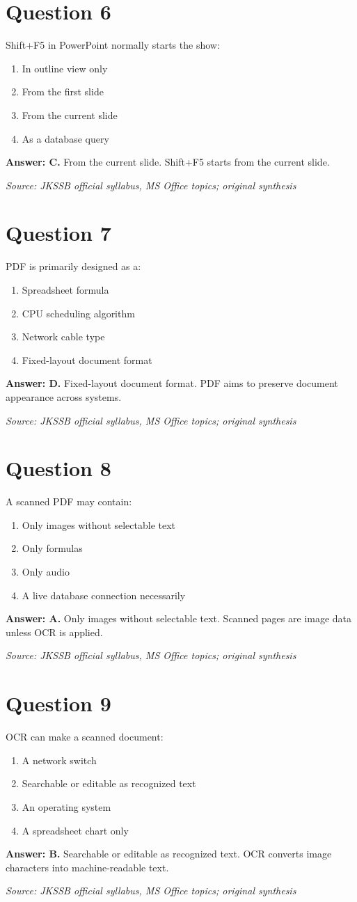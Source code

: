 \documentclass[11pt,a4paper]{book}
\newcommand{\source}[1]{\par\smallskip\textit{Source: #1}}
\newcommand{\answer}[2]{\par\textbf{Answer: #1.} #2}
\begin{document}
\section*{Question 6}
Shift+F5 in PowerPoint normally starts the show:
\begin{enumerate}[label=\Alph*.]
\item In outline view only
\item From the first slide
\item From the current slide
\item As a database query
\end{enumerate}
\answer{C}{From the current slide. Shift+F5 starts from the current slide.}
\source{JKSSB official syllabus, MS Office topics; original synthesis}
\section*{Question 7}
PDF is primarily designed as a:
\begin{enumerate}[label=\Alph*.]
\item Spreadsheet formula
\item CPU scheduling algorithm
\item Network cable type
\item Fixed-layout document format
\end{enumerate}
\answer{D}{Fixed-layout document format. PDF aims to preserve document appearance across systems.}
\source{JKSSB official syllabus, MS Office topics; original synthesis}
\section*{Question 8}
A scanned PDF may contain:
\begin{enumerate}[label=\Alph*.]
\item Only images without selectable text
\item Only formulas
\item Only audio
\item A live database connection necessarily
\end{enumerate}
\answer{A}{Only images without selectable text. Scanned pages are image data unless OCR is applied.}
\source{JKSSB official syllabus, MS Office topics; original synthesis}
\section*{Question 9}
OCR can make a scanned document:
\begin{enumerate}[label=\Alph*.]
\item A network switch
\item Searchable or editable as recognized text
\item An operating system
\item A spreadsheet chart only
\end{enumerate}
\answer{B}{Searchable or editable as recognized text. OCR converts image characters into machine-readable text.}
\source{JKSSB official syllabus, MS Office topics; original synthesis}
\end{document}
